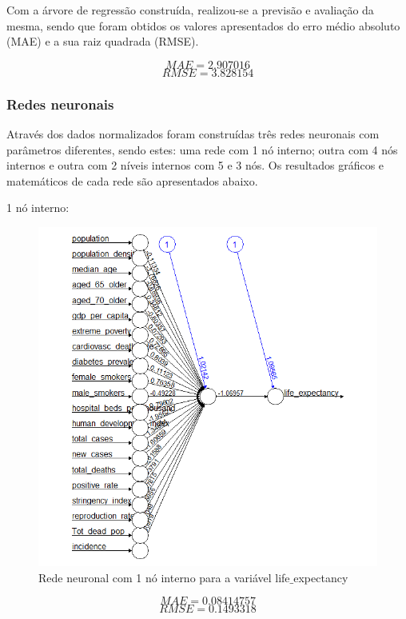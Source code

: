 \documentclass[conference]{IEEEtran}
\begin{document}
Com a árvore de regressão construída, realizou-se a previsão e avaliação da mesma, sendo que foram obtidos os valores apresentados do erro médio absoluto (MAE) e a sua raiz quadrada (RMSE).

\begin{equation}
MAE=2.907016\label{4b_mae}
\end{equation}
\begin{equation}
RMSE=3.828154\label{4b_rmse}
\end{equation}


\subsubsection{Redes neuronais}
Através dos dados normalizados foram construídas três redes neuronais com parâmetros diferentes, sendo estes: uma rede com 1 nó interno; outra com 4 nós internos e outra com 2 níveis internos com 5 e 3 nós. Os resultados gráficos e matemáticos de cada rede são apresentados abaixo.

1 nó interno:
\begin{figure}[htbp]
\centerline{\includegraphics[width=0.95\columnwidth]{images/04_3.png}}
\caption{Rede neuronal com 1 nó interno para a variável life$\_$expectancy}
\label{4b}
\end{figure}
\begin{equation}
MAE=0.08414757\label{4c1_mae}
\end{equation}
\begin{equation}
RMSE=0.1493318\label{4c1_rmse}
\end{equation}
\end{document}
